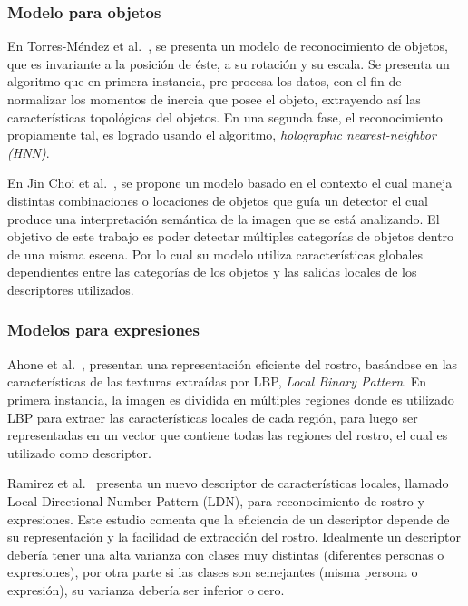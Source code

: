 \subsubsection{Modelo para objetos}
En Torres-Méndez et al.~\cite{trsi2000}, se presenta un modelo de reconocimiento de objetos, que es invariante a la posición de éste, a su rotación y su escala. Se presenta un algoritmo que en primera instancia, pre-procesa los datos, con el fin de normalizar los momentos de inercia que posee el objeto, extrayendo así las características topológicas del objetos. En una segunda fase, el reconocimiento propiamente tal, es logrado usando el algoritmo, \textit{holographic nearest-neighbor (HNN)}.

En Jin Choi et al.~\cite{treebased2012}, se propone un modelo basado en el contexto el cual maneja distintas combinaciones o locaciones de objetos que guía un detector el cual produce una interpretación semántica de la imagen que se está analizando. El objetivo de este trabajo es poder detectar múltiples categorías de objetos dentro de una misma escena. Por lo cual su modelo utiliza características globales dependientes entre las categorías de los objetos y las salidas locales de los descriptores utilizados.

\subsubsection{Modelos para expresiones}
Ahone et al.~\cite{ahone2006}, presentan una representación eficiente del rostro, basándose en las características de las texturas extraídas por LBP, \textit{Local Binary Pattern}. En primera instancia, la imagen es dividida en múltiples regiones donde es utilizado LBP para extraer las características locales de cada región, para luego ser representadas en un vector que contiene todas las regiones del rostro, el cual es utilizado como descriptor.

Ramirez et al.~\cite{ldnp2013} presenta un nuevo descriptor de características locales, llamado Local Directional Number Pattern (LDN), para reconocimiento de rostro y expresiones. Este estudio comenta que la eficiencia de un descriptor depende de su representación y la facilidad de extracción del rostro. Idealmente un descriptor debería tener una alta varianza con clases muy distintas (diferentes personas o expresiones), por otra parte si las clases son semejantes (misma persona o expresión), su varianza debería ser inferior o cero.




